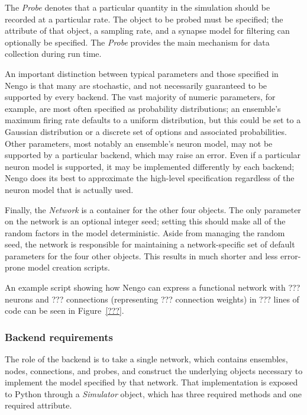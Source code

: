 \documentclass{frontiersSCNS}
\begin{document}
The \textit{Probe} denotes that a particular
quantity in the simulation should be recorded
at a particular rate.
The object to be probed must be specified;
the attribute of that object,
a sampling rate, and a synapse model for filtering
can optionally be specified.
The \textit{Probe} provides the main mechanism
for data collection during run time.

An important distinction between typical
parameters and those specified in Nengo
is that many are stochastic,
and not necessarily guaranteed
to be supported by every backend.
The vast majority of numeric parameters,
for example,
are most often specified as probability distributions;
an ensemble's maximum firing rate defaults to
a uniform distribution,
but this could be set to a Gaussian distribution
or a discrete set of options and associated
probabilities.
Other parameters,
most notably an ensemble's neuron model,
may not be supported by a particular backend,
which may raise an error.
Even if a particular neuron model is supported,
it may be implemented differently by each backend;
Nengo does its best to approximate
the high-level specification regardless of
the neuron model that is actually used.

Finally, the \textit{Network} is a
container for the other four objects.
The only parameter on the network
is an optional integer seed;
setting this should make
all of the random factors
in the model deterministic.
Aside from managing the random seed,
the network is responsible for maintaining
a network-specific set of default parameters
for the four other objects.
This results in much shorter and less error-prone
model creation scripts.

An example script showing how Nengo can
express a functional network
with ??? neurons and ??? connections
(representing ??? connection weights)
in ??? lines of code can be seen
in Figure~\ref{???}.

\subsubsection{Backend requirements}

The role of the backend is to take
a single network, which contains
ensembles, nodes, connections, and probes,
and construct the underlying objects necessary
to implement the model specified by that network.
That implementation is exposed to Python
through a \textit{Simulator} object,
which has three required methods
and one required attribute.
\end{document}
